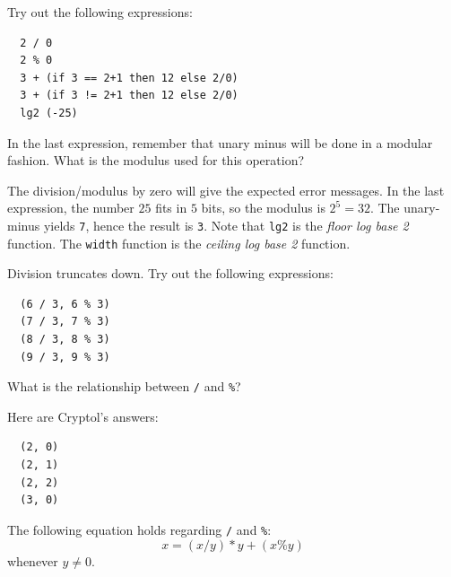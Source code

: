\indModular\indMinus

\begin{Exercise}\label{ex:arith:4}
Try out the following expressions:\indEq\indNeq
\begin{Verbatim}
  2 / 0
  2 % 0
  3 + (if 3 == 2+1 then 12 else 2/0)
  3 + (if 3 != 2+1 then 12 else 2/0)
  lg2 (-25)
\end{Verbatim}
In the last expression, remember that unary minus will\indUnaryMinus
be done in a modular fashion. What is the modulus used for this
operation?
\end{Exercise}
\begin{Answer}
  The division/modulus by zero will give the expected error
  messages. In the last expression, the number $25$ fits in $5$ bits,
  so the modulus is $2^5 = 32$. The unary-minus yields {\tt 7}, hence
  the result is {\tt 3}. Note that {\tt lg2} is the \emph{floor log
    base 2} function. The {\tt width} function is the \emph{ceiling
    log base 2} function.\indLg\indEq\indNeq
\end{Answer}

\begin{Exercise}\label{ex:arith:5:1}
Division truncates down. Try out the following expressions:\indDiv\indMod
\begin{Verbatim}
  (6 / 3, 6 % 3)
  (7 / 3, 7 % 3)
  (8 / 3, 8 % 3)
  (9 / 3, 9 % 3)
\end{Verbatim}
What is the relationship between {\tt /} and {\tt \%}?
\end{Exercise}
\begin{Answer}
Here are Cryptol's answers:\indDiv\indMod
\begin{Verbatim}
  (2, 0)
  (2, 1)
  (2, 2)
  (3, 0)
\end{Verbatim}
The following equation holds regarding {\tt /} and {\tt \%}:
$$
  x = (x / y) * y + (x \% y)
$$
whenever $y \neq 0$.
\end{Answer}

